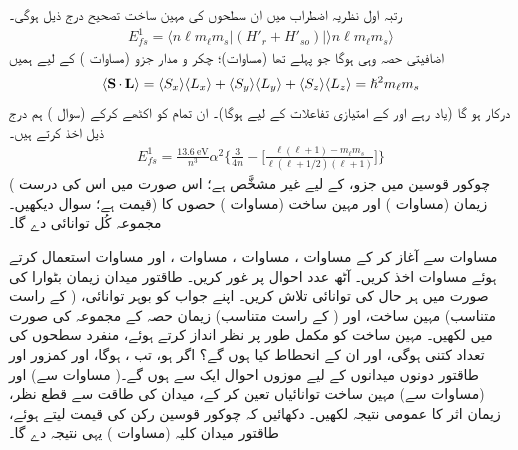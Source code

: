  رتبہ اول نظریہ اضطراب میں ان سطحوں کی مہین ساخت تصحیح درج ذیل ہوگی۔
\begin{align}\label{مساوات_غیر_مضطرب_نظریہ_اضطراب_پہلی_تصحیح}
E_{fs}^1 = \langle n\ell m_{\ell} m_s | (H'_r + H'_{so}) | \rangle n\ell m_{\ell} m_s \rangle
\end{align}
اضافیتی حصہ وہی ہوگا جو پہلے تھا (مساوات)؛ چکر و مدار جزو (مساوات ) کے لیے ہمیں
\begin{align}\label{مساوات_غیر_مضطرب_نقطی_ضرب}
\langle \operatorname{\mathbf{S}} \cdot \operatorname{\mathbf{L}} \rangle = \langle S_x \rangle \langle L_x \rangle + \langle S_y \rangle \langle L_y \rangle + \langle S_z \rangle \langle L_z \rangle = \hslash^2 m_{\ell} m_s
\end{align}
درکار ہو گا (یاد رہے  اور  کے امتیازی تفاعلات کے لیے  ہوگا)۔ ان تمام کو اکٹھے کرکے (سوال ) ہم درج ذیل اخذ کرتے ہیں۔
\begin{align}\label{مساوت_غیر_مضطرب_طاقتور_مہین_ساخت_حصہ}
E_{fs}^1 = \frac{\SI{13.6}{\electronvolt}}{n^3} \alpha^2 \Big \{ \frac{3}{4n} - \Big [ \frac{\ell (\ell + 1) - m_\ell m_s}{\ell (\ell + 1/2)(\ell + 1)} \Big ] \Big\}
\end{align}
( چوکور قوسین میں جزو،  کے لیے غیر مشخَّص ہے؛ اس صورت میں اس کی درست قیمت  ہے؛ سوال  دیکھیں۔) زیمان (مساوات ) اور مہین ساخت (مساوات ) حصوں کا مجموعہ کُل توانائی دے گا۔
 
مساوات  سے آغاز کر کے مساوات ، مساوات ، مساوات ، اور مساوات  استعمال کرتے ہوئے مساوات اخذ کریں۔
آٹھ عدد  احوال  پر غور کریں۔ طاقتور میدان زیمان بٹوارا کی صورت میں ہر حال کی توانائی تلاش کریں۔ اپنے جواب کو بوہر توانائی، (  کے راست متناسب) مہین ساخت، اور (  کے راست متناسب) زیمان حصہ کے مجموعہ کی صورت میں لکھیں۔ مہین ساخت کو مکمل طور پر نظر انداز کرتے ہوئے، منفرد سطحوں کی تعداد کتنی ہوگی، اور ان کے انحطاط کیا ہوں گے؟ 
اگر  ہو، تب ،  ہوگا، اور کمزور اور طاقتور دونوں میدانوں کے لیے موزوں احوال  ایک سے  ہوں گے۔( مساوات  سے)  اور (مساوات  سے) مہین ساخت توانائیاں تعین کر کے، میدان کی طاقت سے قطع نظر،  زیمان اثر کا عمومی نتیجہ لکھیں۔ دکھائیں کہ چوکور قوسین رکن کی قیمت  لیتے ہوئے، طاقتور میدان کلیہ (مساوات ) یہی نتیجہ دے گا۔


